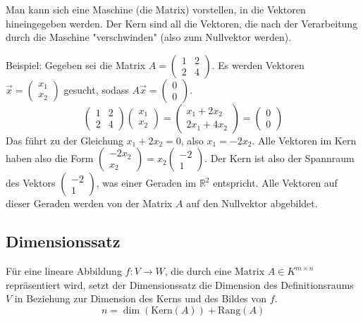 Man kann sich eine Maschine (die Matrix) vorstellen, in die Vektoren
hineingegeben werden. Der Kern sind all die Vektoren, die nach der Verarbeitung
durch die Maschine "verschwinden" (also zum Nullvektor werden).

Beispiel: Gegeben sei die Matrix \(A = \begin{pmatrix} 1 & 2 \\ 2 & 4 \end{pmatrix}\). Es werden Vektoren \(\vec{x} = \begin{pmatrix} x_1 \\ x_2 \end{pmatrix}\) gesucht, sodass \(A\vec{x} = \begin{pmatrix} 0 \\ 0 \end{pmatrix}\).
\[ \begin{pmatrix} 1 & 2 \\ 2 & 4 \end{pmatrix} \begin{pmatrix} x_1 \\ x_2 \end{pmatrix} = \begin{pmatrix} x_1 + 2x_2 \\ 2x_1 + 4x_2 \end{pmatrix} = \begin{pmatrix} 0 \\ 0 \end{pmatrix} \]
Das führt zu der Gleichung \(x_1 + 2x_2 = 0\), also \(x_1 = -2x_2\). Alle
Vektoren im Kern haben also die Form \(\begin{pmatrix} -2x_2 \\ x_2 \end{pmatrix} = x_2 \begin{pmatrix} -2 \\ 1 \end{pmatrix}\).
Der Kern ist also der Spannraum des Vektors \(\begin{pmatrix} -2 \\ 1 \end{pmatrix}\), was einer Geraden im \(\mathbb{R}^2\) entspricht. Alle Vektoren auf dieser Geraden werden von der Matrix \(A\) auf den Nullvektor abgebildet.

\subsection{Dimensionssatz}
Für eine lineare Abbildung \(f: V \to W\), die durch eine Matrix \(A \in K^{m
        \times n}\) repräsentiert wird, setzt der Dimensionssatz die Dimension des
Definitionsraums \(V\) in Beziehung zur Dimension des Kerns und des Bildes von
\(f\).
\[
    n = \dim(\mathrm{Kern}(A)) + \mathrm{Rang}(A)
\]

